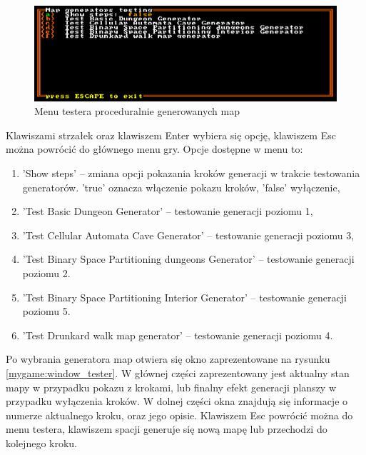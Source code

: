\documentclass[12pt,twoside]{article}
\begin{document}
\FloatBarrier
\begin{figure}[h]
	\centering
	\includegraphics[width=14cm]{images/mygame/gen_test.png}
	\caption{Menu testera proceduralnie generowanych map}
	\label{mygame:gen_test}
\end{figure}
\FloatBarrier

Klawiszami strzałek oraz klawiszem Enter wybiera się opcję, klawiszem Esc można powrócić do głównego menu gry. Opcje dostępne w menu to:

\begin{enumerate}[label=\alph*), leftmargin=1.25cm]
	\item 'Show steps' -- zmiana opcji pokazania kroków generacji w trakcie testowania generatorów. 'true' oznacza włączenie pokazu kroków, 'false' wyłączenie,
	\item 'Test Basic Dungeon Generator' -- testowanie generacji poziomu 1,			
	\item 'Test Cellular Automata Cave Generator' -- testowanie generacji poziomu 3,
	\item 'Test Binary Space Partitioning dungeons Generator' -- testowanie generacji poziomu 2.
	\item 'Test Binary Space Partitioning Interior Generator' -- testowanie generacji poziomu 5.
	\item 'Test Drunkard walk map generator' -- testowanie generacji poziomu 4.
\end{enumerate}

Po wybrania generatora map otwiera się okno zaprezentowane na rysunku \ref{mygame:window_tester}. W głównej części zaprezentowany jest aktualny stan mapy w przypadku pokazu z krokami, lub finalny efekt generacji planszy w przypadku wyłączenia kroków. W dolnej części okna znajdują się informacje o numerze aktualnego kroku, oraz jego opisie. Klawiszem Esc powrócić można do menu testera, klawiszem spacji generuje się nową mapę lub przechodzi do kolejnego kroku.
\end{document}
